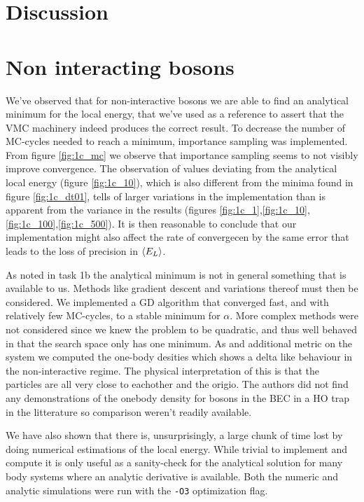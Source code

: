 \section{Discussion}
\section{Non interacting bosons}

We've observed that for non-interactive bosons we are able to find an analytical minimum for the local energy, that we've used as a reference to assert that the VMC machinery indeed produces the correct result. 
To decrease the number of MC-cycles needed to reach a minimum, importance sampling was implemented. 
From figure \ref{fig:1c_mc} we observe that importance sampling seems to not visibly improve convergence. 
The observation of values deviating from the analytical local energy (figure \ref{fig:1c_10}),
which is also different from the minima found in figure \ref{fig:1c_dt01}, tells of larger variations in the implementation than is apparent from the variance in the results
(figures \ref{fig:1c_1},\ref{fig:1c_10},\ref{fig:1c_100},\ref{fig:1c_500}).
It is then reasonable to conclude that our implementation might also affect the rate of convergecen by the same error that leads to the loss of precision in $\langle E_L \rangle$.

As noted in task 1b the analytical minimum is not in general something that is available to us.
Methods like gradient descent and variations thereof must then be considered. We implemented a GD algorithm that converged fast, and with relatively few MC-cycles, to a stable minimum for $\alpha$. More complex methods were not considered since we knew the problem to be quadratic, and thus well behaved in that the search space only has one minimum. 
As and additional metric on the system we computed the one-body desities which shows a delta like behaviour in the non-interactive regime. The physical interpretation of this is that the particles are all very close to eachother and the origio. The authors did not find any demonstrations of the onebody density for bosons in the BEC in a HO trap in the litterature so comparison weren't readily available. 

We have also shown that there is, unsurprisingly, a large chunk of time lost by doing numerical estimations of the local energy. While trivial to implement and compute it is only useful as a sanity-check for the analytical solution for many body systems where an analytic derivative is available. Both the numeric and analytic simulations were run with the \lstinline{-O3} optimization flag. 

